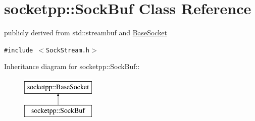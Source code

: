 \hypertarget{classsocketpp_1_1SockBuf}{
\section{socketpp::SockBuf Class Reference}
\label{classsocketpp_1_1SockBuf}
}
publicly derived from std::streambuf and \hyperlink{classsocketpp_1_1BaseSocket}{BaseSocket}  


{\tt \#include $<$SockStream.h$>$}

Inheritance diagram for socketpp::SockBuf::\begin{figure}[H]
\begin{center}
\leavevmode
\includegraphics[height=2cm]{classsocketpp_1_1SockBuf}
\end{center}
\end{figure}
